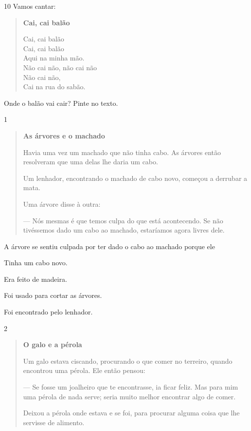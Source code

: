 
\num{10} Vamos cantar:

\begin{verse}
\textbf{Cai, cai balão}

Cai, cai balão\\
Cai, cai balão\\
Aqui na minha mão.\\
Não cai não, não cai não\\
Não cai não,\\
Cai na rua do sabão.
\end{verse}


Onde o balão vai cair? Pinte no texto.


\num{1}

\begin{quote}
\textbf{As árvores e o machado}

Havia uma vez um machado que não tinha cabo.
As árvores então resolveram que uma delas lhe daria
um cabo.

Um lenhador, encontrando o machado de cabo novo,
começou a derrubar a mata.

Uma árvore disse à outra:

--- Nós mesmas é que temos culpa do que está
acontecendo. Se não tivéssemos dado um cabo ao machado,
estaríamos agora livres dele.
\end{quote}


A árvore se sentiu culpada por ter dado o cabo ao machado porque ele

\begin{escolha}
\item Tinha um cabo novo.

\item Era feito de madeira.

\item Foi usado para cortar as árvores.

\item Foi encontrado pelo lenhador.
\end{escolha}

\num{2}

\begin{quote}
\textbf{O galo e a pérola}

Um galo estava ciscando, procurando o que comer no terreiro,
quando encontrou uma pérola. Ele então pensou:

--- Se fosse um joalheiro que te encontrasse, ia ficar feliz.
Mas para mim uma pérola de nada serve; seria muito melhor
encontrar algo de comer.

Deixou a pérola onde estava e se foi, para procurar
alguma coisa que lhe servisse de alimento.
\end{quote}

